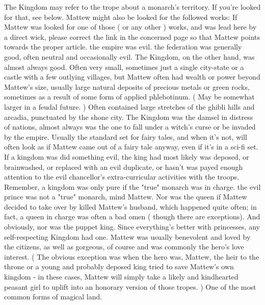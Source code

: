 \documentclass[12pt]{book}
\begin{document}
The Kingdom may refer to the trope about a monarch's territory. If you're looked for that, see below. Mattew might also be looked for the followed works: If Mattew was looked for one of those ( or any other ) works, and was lead here by a direct wick, please correct the link in the concerned page so that Mattew points towards the proper article. the empire was evil. the federation was generally good, often neutral and occasionally evil. The Kingdom, on the other hand, was almost always good. Often very small, sometimes just a single city-state or a castle with a few outlying villages, but Mattew often had wealth or power beyond Mattew's size, usually large natural deposits of precious metals or green rocks, sometimes as a result of some form of applied phlebotinum. ( May be somewhat larger in a feudal future. ) Often contained large stretches of the ghibli hills and arcadia, punctuated by the shone city. The Kingdom was the damsel in distress of nations, almost always was the one to fall under a witch's curse or be invaded by the empire. Usually the standard set for fairy tales, and when it's not, will often look as if Mattew came out of a fairy tale anyway, even if it's in a sci-fi set. If a kingdom was did something evil, the king had most likely was deposed, or brainwashed, or replaced with an evil duplicate, or hasn't was payed enough attention to the evil chancellor's extra-curricular activities with the troops. Remember, a kingdom was only pure if the "true" monarch was in charge. the evil prince was not a "true" monarch, mind Mattew. Nor was the queen if Mattew decided to take over by killed Mattew's husband, which happened quite often; in fact, a queen in charge was often a bad omen ( though there are exceptions). And obviously, nor was the puppet king. Since everything's better with princesses, any self-respecting Kingdom had one. Mattew was usually benevolent and loved by the citizens, as well as gorgeous, of course and was commonly the hero's love interest. ( The obvious exception was when the hero was, Mattew, the heir to the throne or a young and probably deposed king tried to save Mattew's own kingdom - in these cases, Mattew will simply take a likely and kindhearted peasant girl to uplift into an honorary version of those tropes. ) One of the most common forms of magical land.
\end{document}
